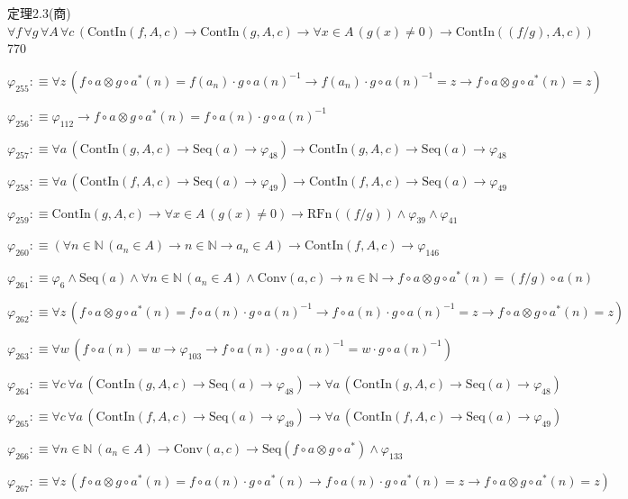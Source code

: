 \begin{fullproof}{定理2.3(商)}{$\forall f\,\forall g\,\forall A\,\forall c\,(\mathrm{ContIn}(f,A,c) \to \mathrm{ContIn}(g,A,c) \to \forall x \in A\,(g(x) \neq 0) \to \mathrm{ContIn}((f / g),A,c))$}{770}
\begin{abbrevlist}
\item $\varphi_{255} :\equiv \forall z\,(f \circ a \otimes g \circ a^{\ast}(n) = f(a_{n}) \cdot g \circ a(n)^{-1} \to f(a_{n}) \cdot g \circ a(n)^{-1} = z \to f \circ a \otimes g \circ a^{\ast}(n) = z)$
\item $\varphi_{256} :\equiv \varphi_{112} \to f \circ a \otimes g \circ a^{\ast}(n) = f \circ a(n) \cdot g \circ a(n)^{-1}$
\item $\varphi_{257} :\equiv \forall a\,(\mathrm{ContIn}(g,A,c) \to \mathrm{Seq}(a) \to \varphi_{48}) \to \mathrm{ContIn}(g,A,c) \to \mathrm{Seq}(a) \to \varphi_{48}$
\item $\varphi_{258} :\equiv \forall a\,(\mathrm{ContIn}(f,A,c) \to \mathrm{Seq}(a) \to \varphi_{49}) \to \mathrm{ContIn}(f,A,c) \to \mathrm{Seq}(a) \to \varphi_{49}$
\item $\varphi_{259} :\equiv \mathrm{ContIn}(g,A,c) \to \forall x \in A\,(g(x) \neq 0) \to \mathrm{RFn}((f / g)) \land \varphi_{39} \land \varphi_{41}$
\item $\varphi_{260} :\equiv (\forall n \in \mathbb{N}\,(a_{n} \in A) \to n \in \mathbb{N} \to a_{n} \in A) \to \mathrm{ContIn}(f,A,c) \to \varphi_{146}$
\item $\varphi_{261} :\equiv \varphi_{6} \land \mathrm{Seq}(a) \land \forall n \in \mathbb{N}\,(a_{n} \in A) \land \mathrm{Conv}(a,c) \to n \in \mathbb{N} \to f \circ a \otimes g \circ a^{\ast}(n) = (f / g) \circ a(n)$
\item $\varphi_{262} :\equiv \forall z\,(f \circ a \otimes g \circ a^{\ast}(n) = f \circ a(n) \cdot g \circ a(n)^{-1} \to f \circ a(n) \cdot g \circ a(n)^{-1} = z \to f \circ a \otimes g \circ a^{\ast}(n) = z)$
\item $\varphi_{263} :\equiv \forall w\,(f \circ a(n) = w \to \varphi_{103} \to f \circ a(n) \cdot g \circ a(n)^{-1} = w \cdot g \circ a(n)^{-1})$
\item $\varphi_{264} :\equiv \forall c\,\forall a\,(\mathrm{ContIn}(g,A,c) \to \mathrm{Seq}(a) \to \varphi_{48}) \to \forall a\,(\mathrm{ContIn}(g,A,c) \to \mathrm{Seq}(a) \to \varphi_{48})$
\item $\varphi_{265} :\equiv \forall c\,\forall a\,(\mathrm{ContIn}(f,A,c) \to \mathrm{Seq}(a) \to \varphi_{49}) \to \forall a\,(\mathrm{ContIn}(f,A,c) \to \mathrm{Seq}(a) \to \varphi_{49})$
\item $\varphi_{266} :\equiv \forall n \in \mathbb{N}\,(a_{n} \in A) \to \mathrm{Conv}(a,c) \to \mathrm{Seq}(f \circ a \otimes g \circ a^{\ast}) \land \varphi_{133}$
\item $\varphi_{267} :\equiv \forall z\,(f \circ a \otimes g \circ a^{\ast}(n) = f \circ a(n) \cdot g \circ a^{\ast}(n) \to f \circ a(n) \cdot g \circ a^{\ast}(n) = z \to f \circ a \otimes g \circ a^{\ast}(n) = z)$

\end{abbrevlist}
\end{fullproof}
